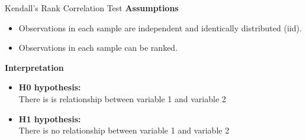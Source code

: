 \begin{frame}[t]{Kendall’s Rank Correlation Test}
	\textbf{Assumptions}
	\begin{itemize}
		\item Observations in each sample are independent and identically distributed (iid).
		\item Observations in each sample can be ranked.
	\end{itemize}
	
	\textbf{Interpretation}
	\begin{itemize}
		\item \textbf{H0 hypothesis:} \\ There is is relationship between variable 1 and variable 2
		\item \textbf{H1 hypothesis:} \\ There is no relationship between variable 1 and variable 2
	\end{itemize}
\end{frame}

